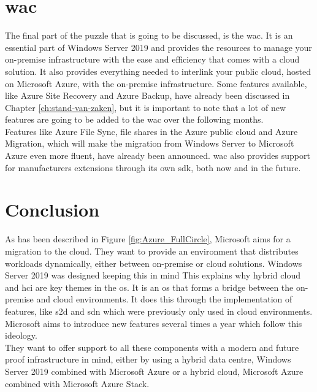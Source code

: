 \section{\acrfull{wac}}
The final part of the puzzle that is going to be discussed, is the \acrlong{wac}. 
It is an essential part of Windows Server 2019 and provides the resources to manage your on-premise infrastructure with the ease and efficiency that comes with a cloud solution. 
It also provides everything needed to interlink your public cloud, hosted on Microsoft Azure, with the on-premise infrastructure. 
Some features available, like Azure Site Recovery and Azure Backup, have already been discussed in Chapter \ref{ch:stand-van-zaken}, but it is important to note that a lot of new features are going to be added to the \acrlong{wac} over the following months. \autocite{Singh2019} 
\\
Features like Azure File Sync, file shares in the Azure public cloud and Azure Migration, which will make the migration from Windows Server to Microsoft Azure even more fluent, have already been announced. 
\acrlong{wac} also provides support for manufacturers extensions through its own \acrfull{sdk}, both now and in the future. 	

\section{Conclusion}
As has been described in Figure \ref{fig:Azure_FullCircle}, Microsoft aims for a migration to the cloud. 
They want to provide an environment that distributes workloads dynamically, either between on-premise or cloud solutions. 
Windows Server 2019 was designed keeping this in mind
This explains why hybrid cloud and \acrshort{hci} are key themes in the \acrshort{os}. 
It is an \acrshort{os} that forms a bridge between the on-premise and cloud environments. 
It does this through the implementation of features, like \acrfull{s2d} and \acrfull{sdn} which were previously only used in cloud environments. 
Microsoft aims to introduce new features several times a year which follow this ideology.
\\
They want to offer support to all these components with a modern and future proof infrastructure in mind, either by using a hybrid data centre, Windows Server 2019 combined with Microsoft Azure or a hybrid cloud, Microsoft Azure combined with Microsoft Azure Stack.